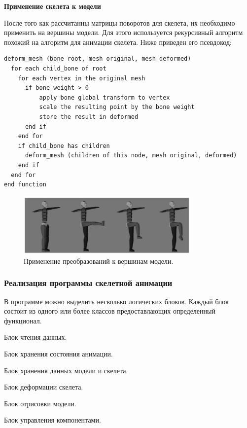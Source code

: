 \textbf{Применение скелета к модели}

После того как рассчитанны матрицы поворотов для скелета, их необходимо применить на вершины модели.
Для этого используется рекурсивный алгоритм похожий на алгоритм для анимации скелета. Ниже приведен его псевдокод:

\begin{small}
\begin{verbatim}
deform_mesh (bone root, mesh original, mesh deformed)
  for each child_bone of root
    for each vertex in the original mesh
      if bone_weight > 0
          apply bone global transform to vertex
          scale the resulting point by the bone weight
          store the result in deformed
      end if
    end for
    if child_bone has children
      deform_mesh (children of this node, mesh original, deformed)
    end if
  end for
end function
\end{verbatim}
\end{small}

\begin{figure}[h!]
    \centering
    \includegraphics[width=0.8\textwidth]{forward_kinematics.png}
    \caption{\small{Применение преобразований к вершинам модели.}}

\end{figure}



\subsubsection{Реализация программы скелетной анимации}
В программе можно выделить несколько логических блоков. Каждый блок состоит из одного или более классов предоставлающих определенный функционал.

\begin{my_enumerate}
\item Блок чтения данных.
\item Блок хранения состояния анимации.
\item Блок хранения данных модели и скелета.
\item Блок деформации скелета.
\item Блок отрисовки модели.
\item Блок управления компонентами.
\end{my_enumerate}

